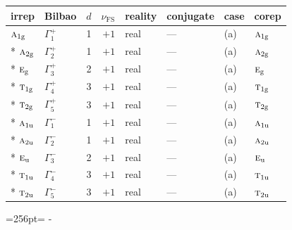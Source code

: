 \documentclass[10pt,a4paper]{article}
\newcommand{\needspace}[1]{\par\penalty-100\begingroup\dimen0=#1\relax\dimen2=\pagegoal
  \advance\dimen2-\pagetotal\ifdim\dimen0>\dimen2\relax\ifdim\dimen2>0pt\vfil\break\fi\fi
  \endgroup}
\numberwithin{equation}{section}
\newcommand{\irr}[1]{\text{\normalfont\scshape #1}}
\newcommand{\ptag}[1]{\mathrm{#1}}
\newcommand{\fsind}{\nu_{\mathrm{FS}}}
\begin{document}
{\small\renewcommand{\arraystretch}{1.25}\setlength{\tabcolsep}{4pt}\begin{longtable}{@{}llrrllll@{}}\toprule
irrep & Bilbao & $d$ & $\fsind$ & reality & conjugate & case & corep\\\midrule\endhead
\bottomrule\endfoot\endlastfoot
$\irr{a}_{1\ptag{g}}$ & $\Gamma_{1}^{+}$ & 1 & $+1$ & real & --- & (a) & $\irr{a}_{1\ptag{g}}$\\*
$\irr{a}_{2\ptag{g}}$ & $\Gamma_{2}^{+}$ & 1 & $+1$ & real & --- & (a) & $\irr{a}_{2\ptag{g}}$\\*
$\irr{e}_{\ptag{g}}$ & $\Gamma_{3}^{+}$ & 2 & $+1$ & real & --- & (a) & $\irr{e}_{\ptag{g}}$\\*
$\irr{t}_{1\ptag{g}}$ & $\Gamma_{4}^{+}$ & 3 & $+1$ & real & --- & (a) & $\irr{t}_{1\ptag{g}}$\\*
$\irr{t}_{2\ptag{g}}$ & $\Gamma_{5}^{+}$ & 3 & $+1$ & real & --- & (a) & $\irr{t}_{2\ptag{g}}$\\*
$\irr{a}_{1\ptag{u}}$ & $\Gamma_{1}^{-}$ & 1 & $+1$ & real & --- & (a) & $\irr{a}_{1\ptag{u}}$\\*
$\irr{a}_{2\ptag{u}}$ & $\Gamma_{2}^{-}$ & 1 & $+1$ & real & --- & (a) & $\irr{a}_{2\ptag{u}}$\\*
$\irr{e}_{\ptag{u}}$ & $\Gamma_{3}^{-}$ & 2 & $+1$ & real & --- & (a) & $\irr{e}_{\ptag{u}}$\\*
$\irr{t}_{1\ptag{u}}$ & $\Gamma_{4}^{-}$ & 3 & $+1$ & real & --- & (a) & $\irr{t}_{1\ptag{u}}$\\*
$\irr{t}_{2\ptag{u}}$ & $\Gamma_{5}^{-}$ & 3 & $+1$ & real & --- & (a) & $\irr{t}_{2\ptag{u}}$\\
\bottomrule\end{longtable}}
\needspace{256pt}
\end{document}
